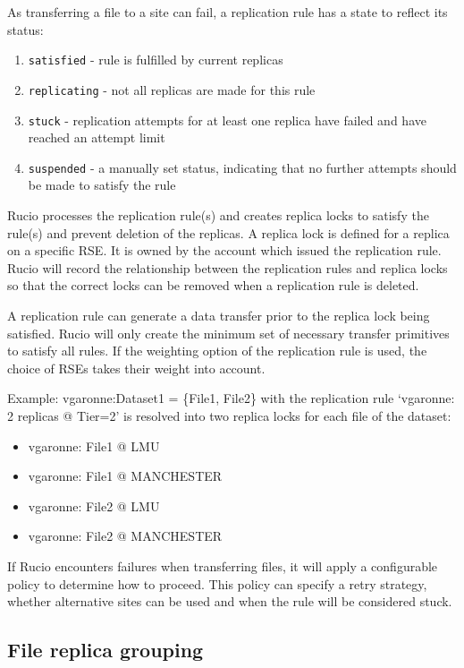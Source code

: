 \documentclass{atlasnote}
\newcommand{\code}[1]{\texttt{#1}}
\begin{document}
\medskip

As transferring a file to a site can fail, a replication rule has a state to reflect its status:

\begin{enumerate}
\item[] \code{satisfied} - rule is fulfilled by current replicas
\item[] \code{replicating} - not all replicas are made for this rule
\item[] \code{stuck} - replication attempts for at least one replica have failed and have reached an attempt limit
\item[] \code{suspended} - a manually set status, indicating that no further attempts should be made to satisfy the rule
\end{enumerate}


Rucio processes the replication rule(s) and creates replica locks to satisfy the rule(s) and prevent deletion of the replicas. A replica lock is defined for a replica on a specific RSE. It is owned by the account which issued the replication rule. Rucio will record the relationship between the replication rules and replica locks so that the correct locks can be removed when a replication rule is deleted.

A replication rule can generate a data transfer prior to the replica lock being satisfied. Rucio will only create the minimum set of necessary transfer primitives to satisfy all rules. If the weighting option of the replication rule is used, the choice of RSEs takes their weight into account.

Example: vgaronne:Dataset1 = \{File1, File2\} with the replication rule ‘vgaronne: 2 replicas @ Tier=2’ is resolved into two replica locks for each file of the dataset:
\begin{itemize}
	\item[] vgaronne: File1 @ LMU
	\item[] vgaronne: File1 @ MANCHESTER
	\item[] vgaronne: File2 @ LMU
	\item[] vgaronne: File2 @ MANCHESTER
\end{itemize}

If Rucio encounters failures when transferring files, it will apply a configurable policy to determine how to proceed. This policy can specify a retry strategy, whether alternative sites can be used and when the rule will be considered stuck.

\subsection{File replica grouping}
\label{sec:file-replica-grouping}
\end{document}
